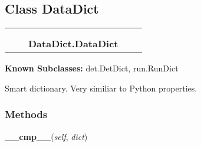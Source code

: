 
\subsection{Class DataDict}

    \label{DataDict:DataDict}
\begin{tabular}{cccccc}
\multicolumn{2}{r}{\settowidth{\BCL}{object}\multirow{2}{\BCL}{object}}
&&
  \\\cline{3-3}
  &&\multicolumn{1}{c|}{}
&&
  \\
&&\multicolumn{2}{l}{\textbf{DataDict.DataDict}}
\end{tabular}

\textbf{Known Subclasses:}
det.DetDict,
    run.RunDict

Smart dictionary. Very similiar to Python properties.



  \subsubsection{Methods}

    \label{DataDict:DataDict:__cmp__}

    \vspace{0.5ex}

    \begin{boxedminipage}{\textwidth}

    \raggedright \textbf{\_\_cmp\_\_}(\textit{self}, \textit{dict})

    \end{boxedminipage}

    \label{DataDict:DataDict:__contains__}

    \vspace{0.5ex}

